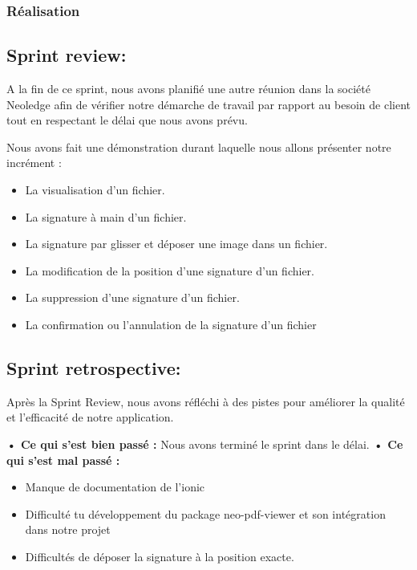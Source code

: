 \subsubsection{Réalisation}

\subsection{Sprint review:}


A la fin de ce sprint, nous avons planifié une autre réunion dans la société Neoledge  afin de vérifier notre démarche de travail par rapport au besoin de client tout en respectant le délai que nous avons prévu.

Nous avons fait une démonstration durant laquelle nous allons présenter notre incrément :
\begin{itemize}
  \item La visualisation d'un fichier.
  \item La signature à main d'un fichier.
  \item La signature par glisser et déposer une image dans un fichier.
  \item La modification de la position d'une signature d'un fichier.
  \item La suppression d'une signature d'un fichier.
  \item La confirmation ou l'annulation de la signature d'un fichier
\end{itemize}

\subsection{Sprint retrospective:}

Après la Sprint Review, nous avons réfléchi à des pistes pour améliorer la qualité et l'efficacité de notre application.


\noindent\textbf{•	Ce qui s'est bien passé :}
Nous avons terminé le sprint dans le délai.
\noindent\textbf{•	Ce qui s'est mal passé :}
\begin{itemize}
  \item Manque de documentation de l'ionic
  \item Difficulté tu développement du package neo-pdf-viewer et son intégration dans notre projet
  \item Difficultés de déposer la signature à la position exacte.
\end{itemize}

